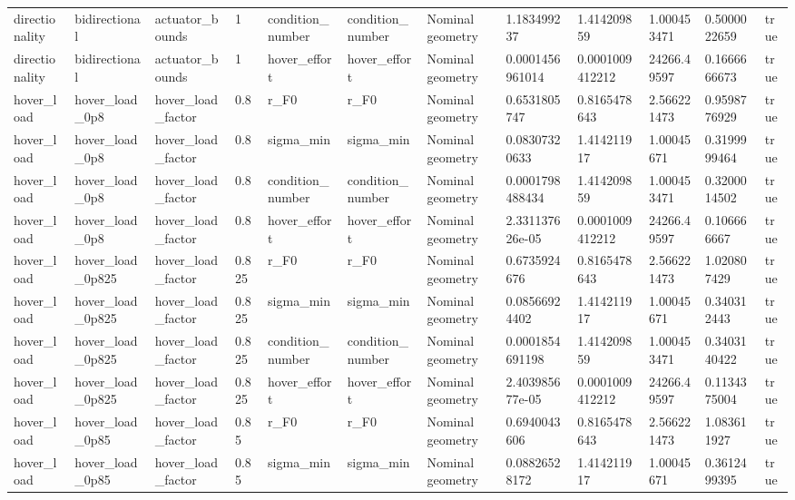 \begin{tabular}{@{}llllllllllll@{}}
directionality & bidirectional & actuator\_bounds & 1 & condition\_number & condition\_number & Nominal geometry & 1.183499237 & 1.414209859 & 1.000453471 & 0.5000022659 & true \\
directionality & bidirectional & actuator\_bounds & 1 & hover\_effort & hover\_effort & Nominal geometry & 0.0001456961014 & 0.0001009412212 & 24266.49597 & 0.1666666673 & true \\
hover\_load & hover\_load\_0p8 & hover\_load\_factor & 0.8 & r\_F0 & r\_F0 & Nominal geometry & 0.6531805747 & 0.8165478643 & 2.566221473 & 0.9598776929 & true \\
hover\_load & hover\_load\_0p8 & hover\_load\_factor & 0.8 & sigma\_min & sigma\_min & Nominal geometry & 0.08307320633 & 1.414211917 & 1.00045671 & 0.3199999464 & true \\
hover\_load & hover\_load\_0p8 & hover\_load\_factor & 0.8 & condition\_number & condition\_number & Nominal geometry & 0.0001798488434 & 1.414209859 & 1.000453471 & 0.3200014502 & true \\
hover\_load & hover\_load\_0p8 & hover\_load\_factor & 0.8 & hover\_effort & hover\_effort & Nominal geometry & 2.331137626e-05 & 0.0001009412212 & 24266.49597 & 0.106666667 & true \\
hover\_load & hover\_load\_0p825 & hover\_load\_factor & 0.825 & r\_F0 & r\_F0 & Nominal geometry & 0.6735924676 & 0.8165478643 & 2.566221473 & 1.020807429 & true \\
hover\_load & hover\_load\_0p825 & hover\_load\_factor & 0.825 & sigma\_min & sigma\_min & Nominal geometry & 0.08566924402 & 1.414211917 & 1.00045671 & 0.340312443 & true \\
hover\_load & hover\_load\_0p825 & hover\_load\_factor & 0.825 & condition\_number & condition\_number & Nominal geometry & 0.0001854691198 & 1.414209859 & 1.000453471 & 0.3403140422 & true \\
hover\_load & hover\_load\_0p825 & hover\_load\_factor & 0.825 & hover\_effort & hover\_effort & Nominal geometry & 2.403985677e-05 & 0.0001009412212 & 24266.49597 & 0.1134375004 & true \\
hover\_load & hover\_load\_0p85 & hover\_load\_factor & 0.85 & r\_F0 & r\_F0 & Nominal geometry & 0.6940043606 & 0.8165478643 & 2.566221473 & 1.083611927 & true \\
hover\_load & hover\_load\_0p85 & hover\_load\_factor & 0.85 & sigma\_min & sigma\_min & Nominal geometry & 0.08826528172 & 1.414211917 & 1.00045671 & 0.3612499395 & true \\

\end{tabular}
